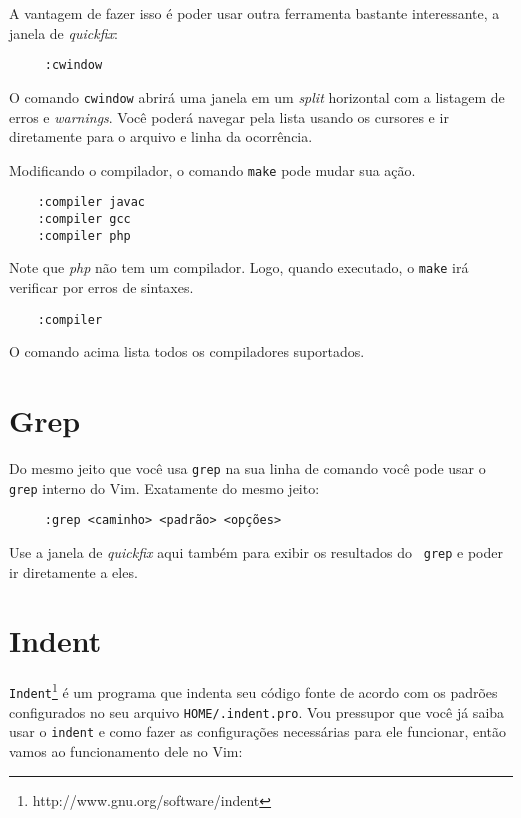 A vantagem de fazer isso é poder usar outra ferramenta bastante interessante, a janela
de {\em quickfix}:

\begin{verbatim}
     :cwindow
\end{verbatim}

O comando {\tt cwindow} abrirá uma janela em um {\em split} horizontal com a
listagem de erros e {\em warnings}.  Você poderá navegar pela lista usando os
cursores e ir diretamente para o arquivo e linha da ocorrência.

Modificando o compilador, o comando {\tt make} pode mudar sua ação.

\begin{verbatim}
	:compiler javac
	:compiler gcc
	:compiler php
\end{verbatim}

Note que {\em php} não tem um compilador. Logo, quando executado, o {\tt make} irá verificar
por erros de sintaxes.

\begin{verbatim}
	:compiler
\end{verbatim}

O comando acima lista todos os compiladores suportados.

\section{Grep}

Do mesmo jeito que você usa {\tt grep} na sua linha de comando você pode usar
o {\tt grep} interno do Vim. Exatamente do mesmo jeito:

\begin{verbatim}
     :grep <caminho> <padrão> <opções>
\end{verbatim}

Use a janela de {\em quickfix} aqui também para exibir os resultados do {\tt
grep} e poder ir diretamente a eles.

\section{Indent}

{\tt Indent}\footnote{http://www.gnu.org/software/indent} 
é um programa que indenta seu código fonte de acordo com os padrões configurados
no seu arquivo {\tt HOME/.indent.pro}. Vou pressupor que você já saiba usar o {\tt indent}
e como fazer as configurações necessárias para ele funcionar, então vamos ao funcionamento 
dele no Vim:

